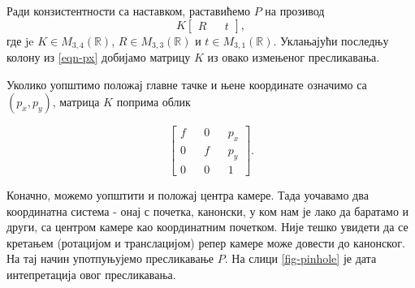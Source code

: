 \documentclass[12pt, a4paper, twoside]{book}
\numberwithin{equation}{chapter}
\numberwithin{theorem}{section}
\numberwithin{definition}{section}
\numberwithin{definitionChapter}{chapter}
\begin{document}
	Ради конзистентности са наставком, раставићемо $P$ на прозивод
	\begin{equation}
		K
		\begin{bmatrix}
			R && t
		\end{bmatrix},
		\label{eqn-krt}
	\end{equation}
	где je $K \in M_{3, 4}(\mathbb{R})$, $R \in M_{3, 3}(\mathbb{R})$ и $t \in M_{3, 1}(\mathbb{R})$.
	Уклањајући последњу колону из \ref{eqn-px} добијамо матрицу $K$ из овако измењеног пресликавања.
	
	Уколико уопштимо положај главне тачке и њене координате означимо са $(p_x, p_y)$, матрица $K$
	поприма облик
	
	\begin{equation}
		\begin{bmatrix}
			f && 0 && p_x \\
			0 && f && p_y \\
			0 && 0 && 1
		\end{bmatrix}.
	\end{equation}

	Коначно, можемо уопштити и положај центра камере. Тада уочавамо два координатна система -
	онај с почетка, канонски, у ком нам је лако да баратамо и други, са центром камере као
	координатним почетком. Није тешко увидети да се кретањем (ротацијом и транслацијом) репер камере
	може довести до канонског. На тај начин употпуњујемо пресликавање $P$. На слици \ref{fig-pinhole} 
	је дата интепретација овог пресликавања.
	
\end{document}
